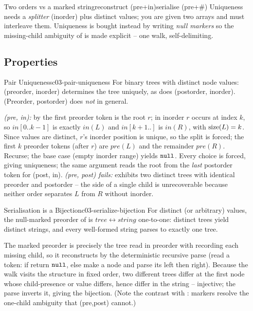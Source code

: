 \begin{vsbox}{Two orders vs a marked string}{reconstruct (pre+in)}{serialise (pre+\#)}
{ Uniqueness needs a \emph{splitter} (inorder) plus distinct values; you are given two
arrays and must interleave them. }
{ Uniqueness is bought instead by writing \emph{null markers} so the missing-child
ambiguity of  is made explicit -- one walk, self-delimiting. }
\end{vsbox}

\subsection{Properties}

\begin{theorem}{Pair Uniqueness}{c03-pair-uniqueness}
For binary trees with distinct node values: (preorder, inorder) determines the tree
uniquely, as does (postorder, inorder). (Preorder, postorder) does \emph{not} in general.
\end{theorem}
\begin{proofbox}
\emph{(pre, in):} by  the first preorder token is the root $r$;
in inorder $r$ occurs at index $k$, so $\mathit{in}[0..k{-}1]$ is exactly
$\mathit{in}(L)$ and $\mathit{in}[k{+}1..]$ is $\mathit{in}(R)$, with $\operatorname{size}(L)=k$. Since
values are distinct, $r$'s inorder position is unique, so the split is forced; the first
$k$ preorder tokens (after $r$) are $\mathit{pre}(L)$ and the remainder $\mathit{pre}(R)$.
Recurse; the base case (empty inorder range) yields $\texttt{null}$. Every choice is forced, giving
uniqueness; the same argument reads the root from the \emph{last} postorder token for
(post, in). \emph{(pre, post) fails:}  exhibits two distinct trees with
identical preorder and postorder -- the side of a single child is unrecoverable because
neither order separates $L$ from $R$ without inorder.
\end{proofbox}

\begin{corollary}{Serialisation is a Bijection}{c03-serialize-bijection}
For distinct (or arbitrary) values, the null-marked preorder of  is
$\mathit{tree} \leftrightarrow \mathit{string}$ one-to-one: distinct trees yield distinct
strings, and every well-formed string parses to exactly one tree.
\end{corollary}
\begin{proofbox}
The marked preorder is precisely the tree read in preorder with \code{\#} recording each
missing child, so it reconstructs by the deterministic recursive parse (read a token: if
\code{\#} return $\texttt{null}$, else make a node and parse its left then right). Because the walk
visits the structure in fixed order, two different trees differ at the first node whose
child-presence or value differs, hence differ in the string -- injective; the parse inverts
it, giving the bijection. (Note the contrast with : markers
resolve the one-child ambiguity that (pre,post) cannot.)
\end{proofbox}

